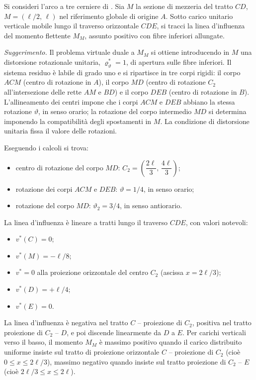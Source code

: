 \begin{esercizio}
	\label{ex:LI_MM_arco}
	
	Si consideri l'arco a tre cerniere di
	. Sia $M$ la sezione di mezzeria del
	tratto $CD$, $M = (\ell/2,\,\ell)$ nel riferimento globale di
	origine $A$. Sotto carico unitario verticale mobile lungo il
	traverso orizzontale $CDE$, si tracci la linea d'influenza del
	momento flettente $M_M$, assunto positivo con fibre inferiori
	allungate.
	
	\textit{Suggerimento.} Il problema virtuale duale a $M_M$ si
	ottiene introducendo in $M$ una distorsione rotazionale
	unitaria, $\varrho_\vartheta^{*} = 1$, di apertura sulle fibre
	inferiori. Il sistema residuo è labile di grado uno e si
	ripartisce in tre corpi rigidi: il corpo $ACM$ (centro di
	rotazione in $A$), il corpo $MD$ (centro di rotazione $C_2$
	all'intersezione delle rette $AM$ e $BD$) e il corpo $DEB$
	(centro di rotazione in $B$). L'allineamento dei centri impone
	che i corpi $ACM$ e $DEB$ abbiano la stessa rotazione
	$\vartheta$, in senso orario; la rotazione del corpo intermedio
	$MD$ si determina imponendo la compatibilità degli spostamenti
	in $M$. La condizione di distorsione unitaria fissa il valore
	delle rotazioni.
	
	Eseguendo i calcoli si trova:
	\begin{itemize}[noitemsep,topsep=2pt]
		\item centro di rotazione del corpo $MD$:
		$C_2 = \left(\dfrac{2\ell}{3},\,\dfrac{4\ell}{3}\right)$;
		\item rotazione dei corpi $ACM$ e $DEB$: $\vartheta = 1/4$,
		in senso orario;
		\item rotazione del corpo $MD$: $\vartheta_2 = 3/4$, in
		senso antiorario.
	\end{itemize}
	
	\risultato La linea d'influenza è lineare a tratti lungo il
	traverso $CDE$, con valori notevoli:
	\begin{itemize}[noitemsep,topsep=2pt]
		\item $v^{*}(C) = 0$;
		\item $v^{*}(M) = -\ell/8$;
		\item $v^{*} = 0$ alla proiezione orizzontale del centro $C_2$
		(ascissa $x = 2\ell/3$);
		\item $v^{*}(D) = +\ell/4$;
		\item $v^{*}(E) = 0$.
	\end{itemize}
	La linea d'influenza è negativa nel tratto $C$ -- proiezione di
	$C_2$, positiva nel tratto proiezione di $C_2$ -- $D$, e poi
	discende linearmente da $D$ a $E$. Per carichi verticali verso
	il basso, il momento $M_M$ è massimo positivo quando il carico
	distribuito uniforme insiste sul tratto di proiezione orizzontale
	$C$ -- proiezione di $C_2$ (cioè $0 \le x \le 2\ell/3$), massimo
	negativo quando insiste sul tratto proiezione di $C_2$ -- $E$
	(cioè $2\ell/3 \le x \le 2\ell$).
	
\end{esercizio}

